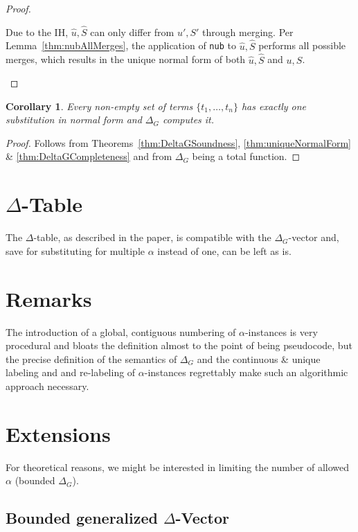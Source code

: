 \documentclass[a4paper, 11pt]{report}
\newtheorem{corollary}{Corollary}
\begin{document}
\begin{proof}
\begin{enumerate}
\begin{enumerate}
      Due to the IH, $\widehat{u},\widehat{S}$ can only differ from $u',S'$ through merging. Per Lemma~\ref{thm:nubAllMerges}, the application of \texttt{nub} to $\widehat{u},\widehat{S}$ performs all possible merges, which results in the unique normal form of both $\widehat{u},\widehat{S}$ and $u,S$.
    \end{enumerate}
  \end{enumerate}
\end{proof}

\begin{corollary}
  Every non-empty set of terms $\{t_1,\dots,t_n\}$ has exactly one substitution in normal form and $\Delta_G$ computes it.
  \label{thm:deltaGCorrectness}
\end{corollary}

\begin{proof}
  Follows from Theorems~\ref{thm:DeltaGSoundness}, \ref{thm:uniqueNormalForm} \& \ref{thm:DeltaGCompleteness} and from $\Delta_G$ being a total function.
\end{proof}


\section{$\Delta$-Table}

The $\Delta$-table, as described in the paper, is compatible with the $\Delta_G$-vector and, save for substituting for multiple $\alpha$ instead of one, can be left as is. 

\section{Remarks}

The introduction of a global, contiguous numbering of $\alpha$-instances is very procedural and bloats the definition almost to the point of being pseudocode, but the precise definition of the semantics of $\Delta_G$ and the continuous \& unique labeling and and re-labeling of $\alpha$-instances regrettably make such an algorithmic approach necessary.\\

\section{Extensions}

For theoretical reasons, we might be interested in limiting the number of allowed $\alpha$ (bounded $\Delta_G$).

\subsection{Bounded generalized $\Delta$-Vector}
\end{document}
